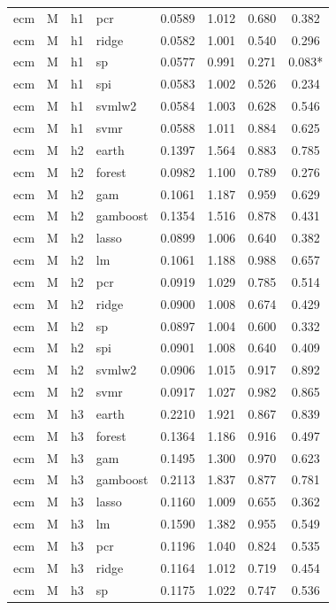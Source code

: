 \begin{ThreePartTable}
\begin{longtable}[t]{llclcccc}
ecm & M & h1 & pcr & 0.0589 & 1.012 & 0.680 & 0.382\\
ecm & M & h1 & ridge & 0.0582 & 1.001 & 0.540 & 0.296\\
ecm & M & h1 & sp & 0.0577 & 0.991 & 0.271 & 0.083*\\
ecm & M & h1 & spi & 0.0583 & 1.002 & 0.526 & 0.234\\
ecm & M & h1 & svmlw2 & 0.0584 & 1.003 & 0.628 & 0.546\\
ecm & M & h1 & svmr & 0.0588 & 1.011 & 0.884 & 0.625\\
\addlinespace
ecm & M & h2 & earth & 0.1397 & 1.564 & 0.883 & 0.785\\
ecm & M & h2 & forest & 0.0982 & 1.100 & 0.789 & 0.276\\
ecm & M & h2 & gam & 0.1061 & 1.187 & 0.959 & 0.629\\
ecm & M & h2 & gamboost & 0.1354 & 1.516 & 0.878 & 0.431\\
ecm & M & h2 & lasso & 0.0899 & 1.006 & 0.640 & 0.382\\
ecm & M & h2 & lm & 0.1061 & 1.188 & 0.988 & 0.657\\
ecm & M & h2 & pcr & 0.0919 & 1.029 & 0.785 & 0.514\\
ecm & M & h2 & ridge & 0.0900 & 1.008 & 0.674 & 0.429\\
ecm & M & h2 & sp & 0.0897 & 1.004 & 0.600 & 0.332\\
ecm & M & h2 & spi & 0.0901 & 1.008 & 0.640 & 0.409\\
ecm & M & h2 & svmlw2 & 0.0906 & 1.015 & 0.917 & 0.892\\
ecm & M & h2 & svmr & 0.0917 & 1.027 & 0.982 & 0.865\\
\addlinespace
ecm & M & h3 & earth & 0.2210 & 1.921 & 0.867 & 0.839\\
ecm & M & h3 & forest & 0.1364 & 1.186 & 0.916 & 0.497\\
ecm & M & h3 & gam & 0.1495 & 1.300 & 0.970 & 0.623\\
ecm & M & h3 & gamboost & 0.2113 & 1.837 & 0.877 & 0.781\\
ecm & M & h3 & lasso & 0.1160 & 1.009 & 0.655 & 0.362\\
ecm & M & h3 & lm & 0.1590 & 1.382 & 0.955 & 0.549\\
ecm & M & h3 & pcr & 0.1196 & 1.040 & 0.824 & 0.535\\
ecm & M & h3 & ridge & 0.1164 & 1.012 & 0.719 & 0.454\\
ecm & M & h3 & sp & 0.1175 & 1.022 & 0.747 & 0.536\\

\end{longtable}
\end{ThreePartTable}
